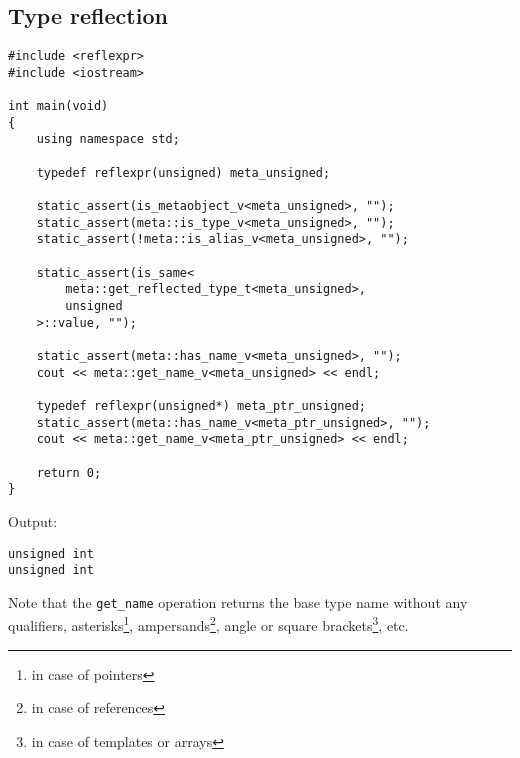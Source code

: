 \subsection{Type reflection}

\begin{verbatim}
#include <reflexpr>
#include <iostream>

int main(void)
{
	using namespace std;

	typedef reflexpr(unsigned) meta_unsigned;

	static_assert(is_metaobject_v<meta_unsigned>, "");
	static_assert(meta::is_type_v<meta_unsigned>, "");
	static_assert(!meta::is_alias_v<meta_unsigned>, "");

	static_assert(is_same<
		meta::get_reflected_type_t<meta_unsigned>,
		unsigned
	>::value, "");

	static_assert(meta::has_name_v<meta_unsigned>, "");
	cout << meta::get_name_v<meta_unsigned> << endl;

	typedef reflexpr(unsigned*) meta_ptr_unsigned;
	static_assert(meta::has_name_v<meta_ptr_unsigned>, "");
	cout << meta::get_name_v<meta_ptr_unsigned> << endl;

	return 0;
}
\end{verbatim}

Output:

\begin{verbatim}
unsigned int
unsigned int
\end{verbatim}

Note that the \texttt{get\_name} operation returns the base type name without
any qualifiers, asterisks\footnote{in case of pointers},
ampersands\footnote{in case of references}, angle or square brackets\footnote{
in case of templates or arrays}, etc.

